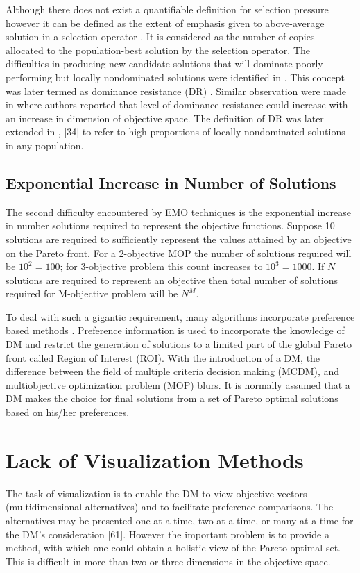 Although there does not exist a quantifiable definition for selection pressure however it can be defined as the extent of emphasis given to above-average solution in a selection operator \cite{3blue1brown}. It is considered as the number of copies allocated to the population-best solution by the selection operator. The difficulties in producing new candidate solutions that will dominate poorly performing but locally nondominated solutions were identified in \cite{Acosta2019}. This concept was later termed as dominance resistance (DR) \cite{Ali2021}. Similar observation were made in \cite{Alimamy2018} where authors reported that level of dominance resistance could increase with an increase in dimension of objective space. The definition of DR was later extended in \cite{Anjum2024}, [34] to refer to high proportions of locally nondominated solutions in any population.  \par


\subsection{Exponential Increase in Number of Solutions}\label{expincrease}
The second difficulty encountered by EMO techniques is the exponential increase in number solutions required to represent the objective functions. Suppose 10 solutions are required to sufficiently represent the values attained by an objective on the Pareto front. For a 2-objective MOP the number of solutions required will be $10^2=100$; for 3-objective problem this count increases to $10^3=1000$. If $N$ solutions are required to represent an objective then total number of solutions required for M-objective problem will be $N^M$. \par

To deal with such a gigantic requirement, many algorithms incorporate preference based methods \cite{Bouteraa2024,Dai2023,Bjork2006}. Preference information is used to incorporate the knowledge of DM and restrict the generation of solutions to a limited part of the global Pareto front \cite{Yang2022} called Region of Interest (ROI). With the introduction of a DM, the difference between the field of multiple criteria decision making (MCDM), and multiobjective optimization problem (MOP) blurs. It is normally assumed that a DM makes the choice for final solutions from a set of Pareto optimal solutions based on his/her preferences. 

\section{Lack of Visualization Methods}\label{lackof}
The task of visualization is to enable the DM to view objective vectors (multidimensional alternatives) and to facilitate preference comparisons. The alternatives may be presented one at a time, two at a time, or many at a time for the DM’s consideration [61]. However the important problem is to provide a method, with which one could obtain a holistic view of the Pareto optimal set. This is diﬃcult in more than two or three dimensions in the objective space. \par


